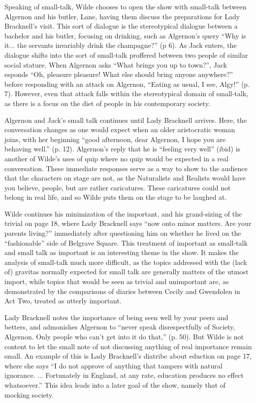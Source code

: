 \documentclass[12pt]{article}[titlepage]
\newcommand{\say}[1]{``#1''}
\newcommand{\1}{\={a}}
\newcommand{\2}{\={e}}
\newcommand{\3}{\={\i}}
\newcommand{\4}{\=o}
\newcommand{\5}{\=u}
\newcommand{\6}{\={A}}
\renewcommand{\,}{\textsuperscript{,}}
\begin{document}
Speaking of small-talk, Wilde chooses to open the show with small-talk between Algernon and his butler, Lane, having them discuss the preparations for Lady Bracknell's visit.
This sort of dialogue is the stereotypical dialogue between a bachelor and his butler, focusing on drinking, such as Algernon's query \say{Why is it... the servants invariably drink the champagne?} (p 6).
As Jack enters, the dialogue shifts into the sort of small-talk proffered between two people of similar social stature.
When Algernon asks \say{What brings you up to town?}, Jack esponds \say{Oh, pleasure pleasure! What else should bring anyone anywhere?} before responding with an attack on Algernon, \say{Eating as usual, I see, Algy!} (p. 7).
However, even that attack falls within the stereotypical domain of small-talk, as there is a focus on the diet of people in his contemporary society.

Algernon and Jack's small talk continues until Lady Bracknell arrives.
Here, the conversation changes as one would expect when an older aristocratic woman joins, with her beginning \say{good afternoon, dear Algernon, I hope you are behaving well.} (p. 12).
Algernon's reply that he is \say{feeling very well} (ibid) is another of Wilde's uses of quip where no quip would be expected in a real conversation.
These immediate responses serve as a way to show to the audience that the characters on stage are not, as the Naturalists and Realists would have you believe, people, but are rather caricatures.
These caricatures could not belong in real life, and so Wilde puts them on the stage to be laughed at.

Wilde continues his minimization of the important, and his grand-sizing of the trivial on page 18, where Lady Bracknell says \say{now onto minor matters. Are your parents living?} immediately after questioning him on whether he lived on the \say{fashionable} side of Belgrave Square.
This treatment of important as small-talk and small talk as important is an interesting theme in the show.
It makes the analysis of small-talk much more difficult, as the topics addressed with the (lack of) gravitas normally expected for small talk are generally matters of the utmost import, while topics that would be seen as trivial and unimportant are, as demonstrated by the comparisons of diaries between Cecily and Gwendolen in Act Two, treated as utterly important.

Lady Bracknell notes the importance of being seen well by your peers and betters, and admonishes Algernon to \say{never speak disrespectfully of Society, Algernon. Only people who can't get into it do that,} (p. 50).
But Wilde is not content to let the small note of not discussing anything of real importance remain small.
An example of this is Lady Bracknell's diatribe about eduction on page 17, where she says \say{I do not approve of anything that tampers with natural ignorance. ... Fortunately in England, at any rate, education produces no effect whatsoever.}
This idea leads into a later goal of the show, namely that of mocking society.
\end{document}
